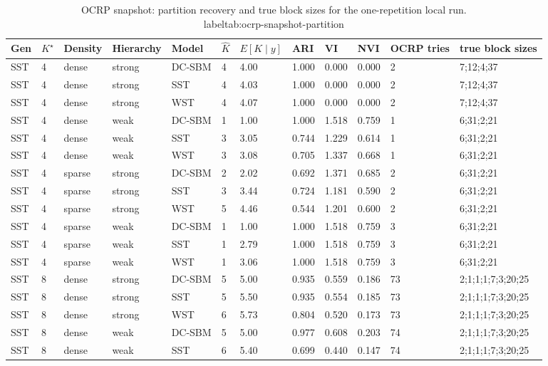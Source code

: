 \begin{table}[!h]
\centering
\caption{OCRP snapshot: partition recovery and true block sizes for the one-repetition local run.\\label{tab:ocrp-snapshot-partition}}
\centering
\begin{tabular}[t]{llllllllllll}
\toprule
Gen & $K^\star$ & Density & Hierarchy & Model & $\hat K$ & $E[K\mid y]$ & ARI & VI & NVI & OCRP tries & true block sizes\\
\midrule
SST & 4 & dense & strong & DC-SBM & 4 & 4.00 & 1.000 & 0.000 & 0.000 & 2 & 7;12;4;37\\
SST & 4 & dense & strong & SST & 4 & 4.03 & 1.000 & 0.000 & 0.000 & 2 & 7;12;4;37\\
SST & 4 & dense & strong & WST & 4 & 4.07 & 1.000 & 0.000 & 0.000 & 2 & 7;12;4;37\\
SST & 4 & dense & weak & DC-SBM & 1 & 1.00 & 1.000 & 1.518 & 0.759 & 1 & 6;31;2;21\\
SST & 4 & dense & weak & SST & 3 & 3.05 & 0.744 & 1.229 & 0.614 & 1 & 6;31;2;21\\
SST & 4 & dense & weak & WST & 3 & 3.08 & 0.705 & 1.337 & 0.668 & 1 & 6;31;2;21\\
SST & 4 & sparse & strong & DC-SBM & 2 & 2.02 & 0.692 & 1.371 & 0.685 & 2 & 6;31;2;21\\
SST & 4 & sparse & strong & SST & 3 & 3.44 & 0.724 & 1.181 & 0.590 & 2 & 6;31;2;21\\
SST & 4 & sparse & strong & WST & 5 & 4.46 & 0.544 & 1.201 & 0.600 & 2 & 6;31;2;21\\
SST & 4 & sparse & weak & DC-SBM & 1 & 1.00 & 1.000 & 1.518 & 0.759 & 3 & 6;31;2;21\\
SST & 4 & sparse & weak & SST & 1 & 2.79 & 1.000 & 1.518 & 0.759 & 3 & 6;31;2;21\\
SST & 4 & sparse & weak & WST & 1 & 3.06 & 1.000 & 1.518 & 0.759 & 3 & 6;31;2;21\\
SST & 8 & dense & strong & DC-SBM & 5 & 5.00 & 0.935 & 0.559 & 0.186 & 73 & 2;1;1;1;7;3;20;25\\
SST & 8 & dense & strong & SST & 5 & 5.50 & 0.935 & 0.554 & 0.185 & 73 & 2;1;1;1;7;3;20;25\\
SST & 8 & dense & strong & WST & 6 & 5.73 & 0.804 & 0.520 & 0.173 & 73 & 2;1;1;1;7;3;20;25\\
SST & 8 & dense & weak & DC-SBM & 5 & 5.00 & 0.977 & 0.608 & 0.203 & 74 & 2;1;1;1;7;3;20;25\\
SST & 8 & dense & weak & SST & 6 & 5.40 & 0.699 & 0.440 & 0.147 & 74 & 2;1;1;1;7;3;20;25\\

\end{tabular}
\end{table}
